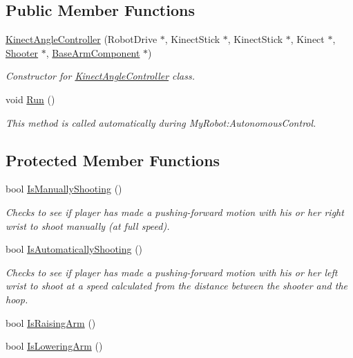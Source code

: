 \subsection*{\-Public \-Member \-Functions}
\begin{DoxyCompactItemize}
\item 
\hyperlink{class_kinect_angle_controller_a8b0f065e8f8f82c899b0a8e2c8b9fefc}{\-Kinect\-Angle\-Controller} (\-Robot\-Drive $\ast$, \-Kinect\-Stick $\ast$, \-Kinect\-Stick $\ast$, \-Kinect $\ast$, \hyperlink{class_shooter}{\-Shooter} $\ast$, \hyperlink{class_base_arm_component}{\-Base\-Arm\-Component} $\ast$)
\begin{DoxyCompactList}\small\item\em \-Constructor for \hyperlink{class_kinect_angle_controller}{\-Kinect\-Angle\-Controller} class. \end{DoxyCompactList}\item 
void \hyperlink{class_kinect_angle_controller_a530d70a40efe4bf2f9536e641805b137}{\-Run} ()
\begin{DoxyCompactList}\small\item\em \-This method is called automatically during \-My\-Robot\-:\-Autonomous\-Control. \end{DoxyCompactList}\end{DoxyCompactItemize}
\subsection*{\-Protected \-Member \-Functions}
\begin{DoxyCompactItemize}
\item 
bool \hyperlink{class_kinect_angle_controller_a143d6fce31c0442970de9714f10f82de}{\-Is\-Manually\-Shooting} ()
\begin{DoxyCompactList}\small\item\em \-Checks to see if player has made a pushing-\/forward motion with his or her right wrist to shoot manually (at full speed). \end{DoxyCompactList}\item 
bool \hyperlink{class_kinect_angle_controller_ad8ac05b016c4b01f1fa595a95564f5b2}{\-Is\-Automatically\-Shooting} ()
\begin{DoxyCompactList}\small\item\em \-Checks to see if player has made a pushing-\/forward motion with his or her left wrist to shoot at a speed calculated from the distance between the shooter and the hoop. \end{DoxyCompactList}\item 
bool \hyperlink{class_kinect_angle_controller_abd47cb548e50524019d7377280d91c01}{\-Is\-Raising\-Arm} ()
\item 
bool \hyperlink{class_kinect_angle_controller_ab1341e591e41220a4e26cb72d2c83747}{\-Is\-Lowering\-Arm} ()
\end{DoxyCompactItemize}
